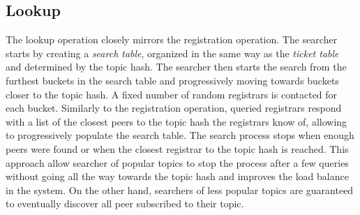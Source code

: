 \subsection{Lookup}
The lookup operation closely mirrors the registration operation. The searcher starts by creating a \emph{search table}, organized in the same way as the \emph{ticket table} and determined by the topic hash. The searcher then starts the search from the furthest buckets in the search table and progressively moving towards buckets closer to the topic hash. A fixed number of random registrars is contacted for each bucket. Similarly to the registration operation, queried registrars respond with a list of the closest peers to the topic hash the registrars know of, allowing to progressively populate the search table. The search process stops when enough peers were found or when the closest registrar to the topic hash is reached. This approach allow searcher of popular topics to stop the process after a few queries without going all the way towards the topic hash and improves the load balance in the system. On the other hand, searchers of less popular topics are guaranteed to eventually discover all peer subscribed to their topic. 
\fi
